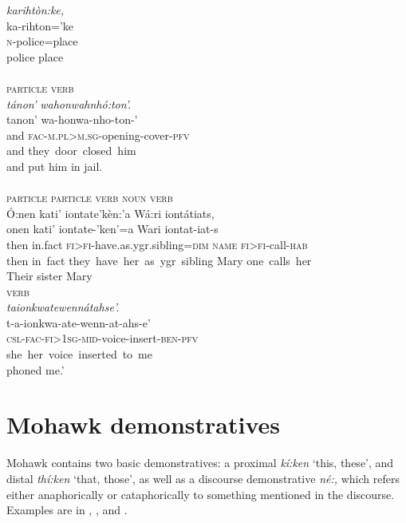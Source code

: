 \documentclass[output=paper]{langscibook}
\begin{document}
\glll \textit{karihtòn:ke,} \\
    ka-rihton=’ke    \\
    \textsc{n}-police=place\\
   \glt police place\\
     ~\\
    
 \glllll
    \textup{\textsc{particle}}  \textup{\textsc{verb}}\\
    \textit{tánon’}    \textit{wahonwahnhó:ton’.}\\
    tanon’    wa-honwa-nho-ton-’\\
    and      \textsc{fac-m.pl>m.sg-}opening-cover-\textsc{pfv}\\
    and      {they~door~closed~him}\\
    \glt and put him in jail.\\
~\\
    \glllll \textup{\textsc{particle}} \textup{\textsc{particle}}  \textup{\textsc{verb}}                \textup{\textsc{noun}}   \textup{\textsc{verb}}\\
    Ó:nen   kati’   iontate’kèn:’a                Wá:ri   iontátiats,\\
    onen   kati’   iontate-’ken’=a              Wari   iontat-iat-s\\
    then    in.fact   \textsc{fi>fi-}have.as.ygr.sibling=\textsc{dim}  \textsc{name}   \textsc{fi>fi}{}-call-\textsc{hab}\\
    then    {in~fact}   {they~have~her~as~ygr~sibling}    Mary  {one~calls~her}\\
     \glt Their sister Mary
~\\
\glllll \textup{\textsc{verb}}\\
 \textit{taionkwatewennátahse’.}\\
    t-a-ionkwa-ate-wenn-at-ahs-e’\\
    \textsc{csl-fac-fi>1sg-mid-}voice-insert-\textsc{ben-pfv}\\
    {she~her~voice~inserted~to~me}\\
    \glt phoned me.’\\
\z

\section{Mohawk demonstratives}
\label{sec:mithun:3}

Mohawk contains two basic demonstratives: a proximal \textit{kí:ken} ‘this, these’, and distal \textit{thí:ken} ‘that, those’, as well as a discourse demonstrative \textit{né:,} which refers either anaphorically or cataphorically to something mentioned in the discourse. Examples are in , , and .
\end{document}
